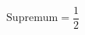 \documentclass[preview]{standalone}
\begin{document}
\begin{align*}
\text{Supremum} = \dfrac{1}{2}
\end{align*}
\end{document}

